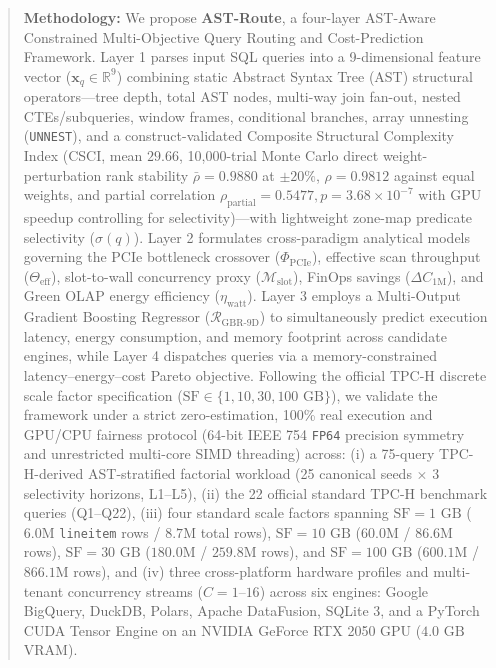 \documentclass[10pt,a4paper]{article}
\begin{document}
\begin{quote}
\textbf{Methodology:} We propose \textbf{AST-Route}, a four-layer AST-Aware Constrained Multi-Objective Query Routing and Cost-Prediction Framework. Layer 1 parses input SQL queries into a 9-dimensional feature vector ($\mathbf{x}_q \in \mathbb{R}^9$) combining static Abstract Syntax Tree (AST) structural operators---tree depth, total AST nodes, multi-way join fan-out, nested CTEs/subqueries, window frames, conditional branches, array unnesting (\texttt{UNNEST}), and a construct-validated Composite Structural Complexity Index (CSCI, mean $29.66$, 10,000-trial Monte Carlo direct weight-perturbation rank stability $\bar{\rho}=0.9880$ at $\pm 20\%$, $\rho=0.9812$ against equal weights, and partial correlation $\rho_{\text{partial}}=0.5477, p=3.68\times 10^{-7}$ with GPU speedup controlling for selectivity)---with lightweight zone-map predicate selectivity ($\sigma(q)$). Layer 2 formulates cross-paradigm analytical models governing the PCIe bottleneck crossover ($\Phi_{\text{PCIe}}$), effective scan throughput ($\Theta_{\text{eff}}$), slot-to-wall concurrency proxy ($\mathcal{M}_{\text{slot}}$), FinOps savings ($\Delta C_{\text{1M}}$), and Green OLAP energy efficiency ($\eta_{\text{watt}}$). Layer 3 employs a Multi-Output Gradient Boosting Regressor ($\mathcal{R}_{\text{GBR-9D}}$) to simultaneously predict execution latency, energy consumption, and memory footprint across candidate engines, while Layer 4 dispatches queries via a memory-constrained latency--energy--cost Pareto objective. Following the official TPC-H discrete scale factor specification ($\text{SF} \in \{1, 10, 30, 100\text{ GB}\}$), we validate the framework under a strict zero-estimation, 100\% real execution and GPU/CPU fairness protocol (64-bit IEEE 754 \texttt{FP64} precision symmetry and unrestricted multi-core SIMD threading) across: (i) a 75-query TPC-H-derived AST-stratified factorial workload (25 canonical seeds $\times$ 3 selectivity horizons, L1--L5), (ii) the 22 official standard TPC-H benchmark queries (Q1--Q22), (iii) four standard scale factors spanning $\text{SF}=1\text{ GB}$ ($6.0\text{M}$ \texttt{lineitem} rows / $8.7\text{M}$ total rows), $\text{SF}=10\text{ GB}$ ($60.0\text{M}$ / $86.6\text{M}$ rows), $\text{SF}=30\text{ GB}$ ($180.0\text{M}$ / $259.8\text{M}$ rows), and $\text{SF}=100\text{ GB}$ ($600.1\text{M}$ / $866.1\text{M}$ rows), and (iv) three cross-platform hardware profiles and multi-tenant concurrency streams ($C=1\text{--}16$) across six engines: Google BigQuery, DuckDB, Polars, Apache DataFusion, SQLite 3, and a PyTorch CUDA Tensor Engine on an NVIDIA GeForce RTX 2050 GPU ($4.0\text{ GB}$ VRAM).\\[0.25em]

\end{quote}
\end{document}
